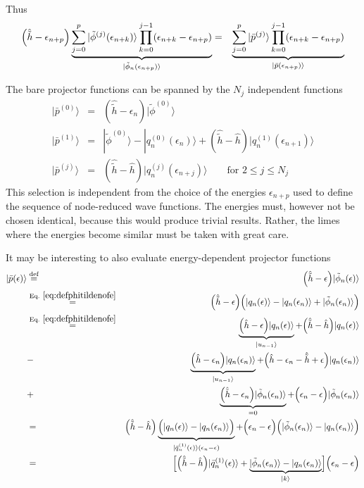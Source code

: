 \documentclass[11pt,a4paper]{report}
\begin{document}
Thus
\begin{eqnarray}
\Bigl(\hat{\tilde{h}}-\epsilon_{n+p}\Bigr)
\underbrace{\sum_{j=0}^{p}|\tilde{\phi}^{(j)}(\epsilon_{n+k})\rangle
\prod_{k=0}^{j-1}(\epsilon_{n+k}-\epsilon_{n+p})}
_{|\tilde{\phi}_n(\epsilon_{n+p})\rangle}
&=&\underbrace{\sum_{j=0}^{p}|\bar{p}^{(j)}\rangle
\prod_{k=0}^{j-1}(\epsilon_{n+k}-\epsilon_{n+p})
}_{|\bar{p}(\epsilon_{n+p})\rangle}
\end{eqnarray}




The bare projector functions can be spanned by the $N_j$ independent functions
\begin{eqnarray}
|\bar{p}^{(0)}\rangle&=&(\hat{\tilde{h}}-\epsilon_{n})|\tilde{\phi}^{(0)}\rangle
\nonumber\\
|\bar{p}^{(1)}\rangle&=&|\tilde{\phi}^{(0)}\rangle-|q_n^{(0)}(\epsilon_n)\rangle
+(\hat{\tilde{h}}-\hat{h})
|q_n^{(1)}(\epsilon_{n+1})\rangle
\nonumber\\
|\bar{p}^{(j)}\rangle&=&(\hat{\tilde{h}}-\hat{h})|q_n^{(j)}(\epsilon_{n+j})\rangle
\qquad\text{for $2\le j\le N_j$}
\label{eq:selectionprojectordfunctions}
\end{eqnarray}
This selection is independent from the choice of the energies
$\epsilon_{n+p}$ used to define the sequence of node-reduced wave
functions. The energies must, however not be chosen identical, because
this would produce trivial results. Rather, the limes where the
energies become similar must be taken with great care.


It may be interesting to also evaluate energy-dependent projector
functions
\begin{eqnarray}
|\bar{p}(\epsilon)\rangle&\defas&
\Bigl(\hat{\tilde{h}}-\epsilon\Bigr)|\tilde{\phi}_n(\epsilon)\rangle
\nonumber\\
&\eqrel{eq:defphitildenofe}{=}&
\Bigl(\hat{\tilde{h}}-\epsilon\Bigr)
\Bigl(|q_n(\epsilon)\rangle-|q_n(\epsilon_n)\rangle+
|\tilde{\phi}_n(\epsilon_n)\rangle\Bigr)
\nonumber\\
&\eqrel{eq:defphitildenofe}{=}&
\underbrace{\Bigl(\hat{h}-\epsilon\Bigr)|q_n(\epsilon)\rangle}_{|u_{n-1}\rangle}
+\Bigl(\hat{\tilde{h}}-\hat{h}\Bigr)|q_n(\epsilon)\rangle
\nonumber\\
&-&\underbrace{
\Bigl(\hat{h}-\epsilon_n\Bigr)|q_n(\epsilon_n)\rangle}_{|u_{n-1}\rangle}
+\Bigl(\hat{h}-\epsilon_n-\hat{\tilde{h}}+\epsilon\Bigr)|q_n(\epsilon_n)\rangle
\nonumber\\
&+&\underbrace{\Bigl(\hat{\tilde{h}}-\epsilon_n\Bigr)|\tilde{\phi}_n(\epsilon_n)\rangle}_{=0}
+\Bigl(\epsilon_n-\epsilon\Bigr)|\tilde{\phi}_n(\epsilon_n)\rangle
\nonumber\\
&=&\Bigl(\hat{\tilde{h}}-\hat{h}\Bigr)
\underbrace{
\Bigl(|q_n(\epsilon)\rangle-|q_n(\epsilon_n)\rangle\Bigr)
}_{|\bar{q}_n^{(1)}(\epsilon)\rangle(\epsilon_n-\epsilon)}
+\Bigl(\epsilon_n-\epsilon\Bigr)
\Bigl(|\tilde{\phi}_n(\epsilon_n)\rangle
-|q_n(\epsilon_n)\rangle\Bigr)
\nonumber\\
&=&\Bigl[
\Bigl(\hat{\tilde{h}}-\hat{h}\Bigr)
|\bar{q}_n^{(1)}(\epsilon)\rangle
+
\underbrace{|\tilde{\phi}_n(\epsilon_n)\rangle
-|q_n(\epsilon_n)\rangle}_{|k\rangle}\Bigr]
\Bigl(\epsilon_n-\epsilon\Bigr)
\end{eqnarray}
\end{document}
